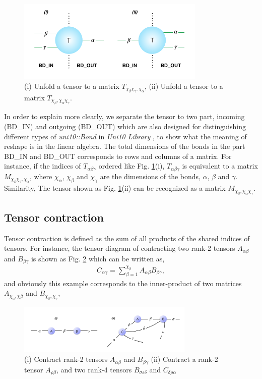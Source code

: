 \begin{figure}[ht]
	\centering
	\includegraphics[width=0.80\textwidth]{figures/fig221.png}
	\caption[Representaion of unfold tensors.]{(i) Unfold a tensor to a matrix $T_{\chi_{\beta}\chi_{\gamma},\chi_{\alpha}}$, (ii) Unfold a tensor to a matrix $T_{\chi_{\beta},\chi_{\alpha}\chi_{\gamma}}$.}
	\label{fig221}
\end{figure}

In order to explain more clearly, we separate the tensor to two part, incoming (BD\_IN) and outgoing (BD\_OUT) which are also designed for distinguishing different types of \textit{uni10::Bond} in \textit{Uni10 Library} \cite{}, to show what the meaning of reshape is in the linear algebra. The total dimensions of the bonds in the part BD\_IN and BD\_OUT corresponds to rows and columns of a matrix. For instance, if the indices of $T_{\alpha \beta \gamma}$ ordered like Fig. \ref{fig221}(i), $T_{\alpha \beta \gamma}$ is equivalent to a matrix $M_{\chi_{\beta}\chi_{\gamma},\chi_{\alpha}}$, where $\chi_{\alpha}$, $\chi_{\beta}$ and $\chi_{\gamma}$ are the dimensions of the bonds, $\alpha$, $\beta$ and $\gamma$. Similarity, The tensor shown as Fig. \ref{fig221}(ii) can be recognized as a matrix $M_{\chi_{\beta},\chi_{\alpha}\chi_{\gamma}}$.
\subsection{Tensor contraction}
Tensor contraction is defined as the sum of all products of the shared indices of tensors. For instance, the tensor diagram of contracting two rank-2 tensors $A_{\alpha \beta}$ and $B_{\beta \gamma}$ is shown as Fig. \ref{fig222} which can be written as, 
\begin{align}
	C_{\alpha \gamma}=\sum\limits_{\beta = 1}^{\chi_{\beta}}{A_{\alpha \beta}B_{\beta \gamma}},
\end{align}
and obviously this example corresponds to the inner-product of two matrices $A_{\chi_{\alpha}, \chi{\beta}}$ and $B_{\chi_{\beta}, \chi_{\gamma}}$,
\begin{figure}[ht]
	\centering
	\includegraphics[width=0.75\textwidth]{figures/fig222.png}
	\caption[The examples of tensor diagrams.]{(i) Contract rank-2 tensors $A_{\alpha \beta}$ and $B_{\beta \gamma} $ (ii) Contract a rank-2 tensor $A_{\rho \beta}$, and two rank-4 tensors $B_{\sigma \varepsilon \delta}$ and $C_{\delta \rho \alpha}$}
	\label{fig222}
\end{figure}

